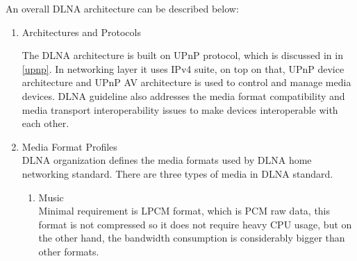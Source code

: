 An overall DLNA architecture \cite{dlna_guideline} can be described below:
\begin{enumerate}
\item Architectures and Protocols

\begin{table}[htb]
\caption{Key Technology Ingredients \label{Table3}}
\begin{center}
\end{center}
\end{table}

The DLNA architecture is built on UPnP protocol, which is discussed in
 in \ref{upnp}.
In networking layer it uses IPv4 suite, on top on that, UPnP device architecture
and UPnP AV architecture is used to control and manage media devices. DLNA
guideline also addresses the media format compatibility and media transport
interoperability issues to make devices interoperable with each other.

\item Media Format Profiles \\
DLNA organization defines the media formats used by DLNA home networking standard. There are 
three types of media in DLNA standard.
\begin{enumerate}
\item Music \\
Minimal requirement is LPCM format, which is PCM raw data, this format is not compressed so 
it does not require heavy CPU usage, but on the other hand, the bandwidth consumption is 
considerably bigger than other formats.


\end{enumerate}
\end{enumerate}
